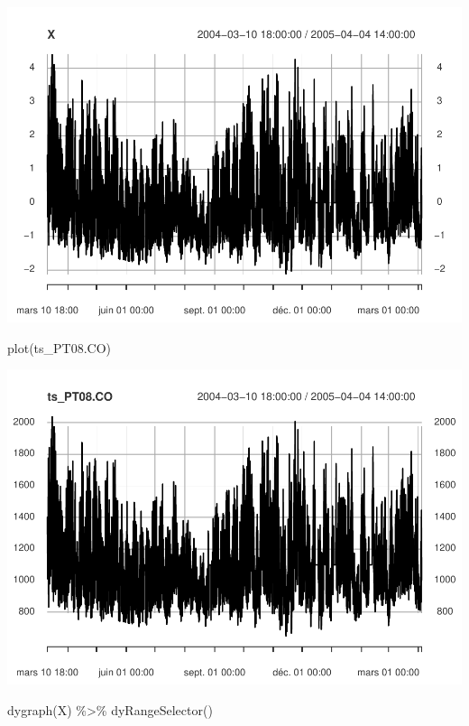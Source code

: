 \documentclass[
]{article}
\newenvironment{Shaded}{\begin{snugshade}}{\end{snugshade}}
\newcommand{\FunctionTok}[1]{\textcolor[rgb]{0.00,0.00,0.00}{#1}}
\newcommand{\NormalTok}[1]{#1}
\newcommand{\SpecialCharTok}[1]{\textcolor[rgb]{0.00,0.00,0.00}{#1}}
\begin{document}
\includegraphics{STA202_report_files/figure-latex/unnamed-chunk-12-1.pdf}

\begin{Shaded}
\begin{Highlighting}[]
\FunctionTok{plot}\NormalTok{(ts\_PT08.CO)}
\end{Highlighting}
\end{Shaded}

\includegraphics{STA202_report_files/figure-latex/unnamed-chunk-12-2.pdf}

\begin{Shaded}
\begin{Highlighting}[]
\FunctionTok{dygraph}\NormalTok{(X) }\SpecialCharTok{\%\textgreater{}\%} \FunctionTok{dyRangeSelector}\NormalTok{()}
\end{Highlighting}
\end{Shaded}
\end{document}
